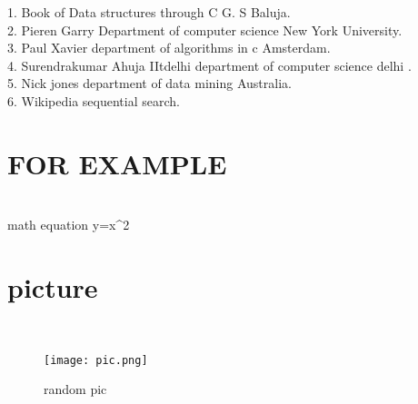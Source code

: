\documentclass{article}
\begin{document}
1. Book of Data structures through C G. S Baluja.\\
2. Pieren Garry Department of computer science 
New York University.\\
3. Paul Xavier department of algorithms in c 
Amsterdam.\\
4. Surendrakumar Ahuja IItdelhi department of 
computer science delhi .\\
5. Nick jones department of data mining Australia.\\
6. Wikipedia sequential search.\\


  
      



\section{FOR EXAMPLE}\\


math equation $$y=x^2
\section{picture}\\
\begin{figure}
    \centering
    \texttt{[image: pic.png]}
    \caption{random pic}
    \label{fig:my_label}
\end{figure}
   
   

      
    
\end{document}
